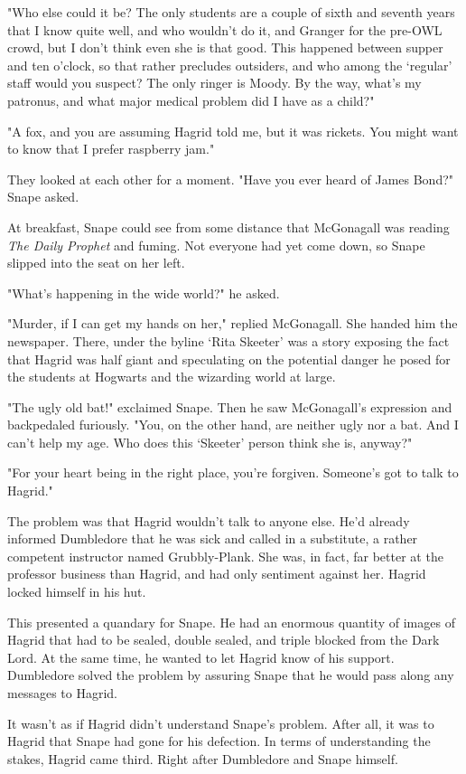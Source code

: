 \documentclass[a4paper,11pt]{article}
\begin{document}
"Who else could it be? The only students are a couple of sixth and seventh years that I know quite well, and who wouldn't do it, and Granger for the pre-OWL crowd, but I don't think even she is that good. This happened between supper and ten o'clock, so that rather precludes outsiders, and who among the `regular' staff would you suspect? The only ringer is Moody. By the way, what's my patronus, and what major medical problem did I have as a child?"

"A fox, and you are assuming Hagrid told me, but it was rickets. You might want to know that I prefer raspberry jam."

They looked at each other for a moment. "Have you ever heard of James Bond?" Snape asked.

At breakfast, Snape could see from some distance that McGonagall was reading \emph{The Daily Prophet} and fuming. Not everyone had yet come down, so Snape slipped into the seat on her left.

"What's happening in the wide world?" he asked.

"Murder, if I can get my hands on her," replied McGonagall. She handed him the newspaper. There, under the byline `Rita Skeeter' was a story exposing the fact that Hagrid was half giant and speculating on the potential danger he posed for the students at Hogwarts and the wizarding world at large.

"The ugly old bat!" exclaimed Snape. Then he saw McGonagall's expression and backpedaled furiously. "You, on the other hand, are neither ugly nor a bat. And I can't help my age. Who does this `Skeeter' person think she is, anyway?"

"For your heart being in the right place, you're forgiven. Someone's got to talk to Hagrid."

The problem was that Hagrid wouldn't talk to anyone else. He'd already informed Dumbledore that he was sick and called in a substitute, a rather competent instructor named Grubbly-Plank. She was, in fact, far better at the professor business than Hagrid, and had only sentiment against her. Hagrid locked himself in his hut.

This presented a quandary for Snape. He had an enormous quantity of images of Hagrid that had to be sealed, double sealed, and triple blocked from the Dark Lord. At the same time, he wanted to let Hagrid know of his support. Dumbledore solved the problem by assuring Snape that he would pass along any messages to Hagrid.

It wasn't as if Hagrid didn't understand Snape's problem. After all, it was to Hagrid that Snape had gone for his defection. In terms of understanding the stakes, Hagrid came third. Right after Dumbledore and Snape himself.
\end{document}
